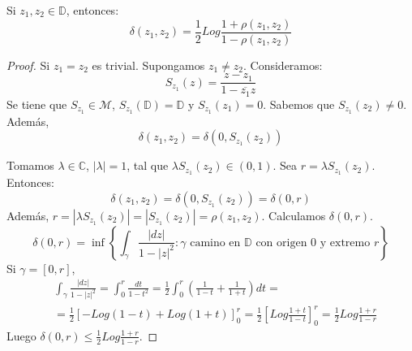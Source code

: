 \begin{proposition}
    Si $z_1, z_2 \in \mathbb{D}$, entonces:
    $$\delta(z_1, z_2) = \frac{1}{2} Log \frac{1+\rho(z_1, z_2)}{1-\rho(z_1, z_2)}$$
\end{proposition}

\begin{proof}
    Si $z_1 = z_2$ es trivial.
    Supongamos $z_1 \neq z_2$.
    Consideramos:
    $$S_{z_1}(z) = \frac{z-z_1}{1-\overline{z_1}z}$$
    Se tiene que $S_{z_1} \in \mathcal{M}$, $S_{z_1}(\mathbb{D}) = \mathbb{D}$ y $S_{z_1}(z_1) = 0$.
    Sabemos que $S_{z_1}(z_2) \neq 0$.
    Además,
    $$\delta(z_1, z_2) = \delta(0, S_{z_1}(z_2))$$

    Tomamos $\lambda \in \mathbb{C}$, $|\lambda| = 1$, tal que $\lambda S_{z_1}(z_2) \in (0, 1)$.
    Sea $r = \lambda S_{z_1}(z_2)$.
    Entonces:
    $$\delta(z_1, z_2) = \delta(0, S_{z_1}(z_2)) = \delta(0, r)$$
    Además, $r = |\lambda S_{z_1}(z_2)| = |S_{z_1}(z_2)| = \rho(z_1, z_2)$.
    Calculamos $\delta(0, r)$.
    $$\delta(0, r) = \inf \left\{\int_\gamma \frac{|dz|}{1-|z|^2} : \gamma \text{ camino en } \mathbb{D} \text{ con origen } 0 \text{ y extremo } r\right\}$$
    Si $\gamma = [0, r]$,
    \begin{align*}
         & \int_\gamma \frac{|dz|}{1-|z|^2} = \int_0^r \frac{dt}{1-t^2} = \frac{1}{2} \int_0^r \left(\frac{1}{1-t} + \frac{1}{1+t}\right)dt =      \\
         & = \frac{1}{2} \left[-Log(1-t) + Log(1+t)\right]_0^r = \frac{1}{2} \left[Log \frac{1+t}{1-t}\right]_0^r = \frac{1}{2} Log\frac{1+r}{1-r}
    \end{align*}
    Luego $\delta(0, r) \leq \frac{1}{2} Log\frac{1+r}{1-r}$.


\end{proof}
